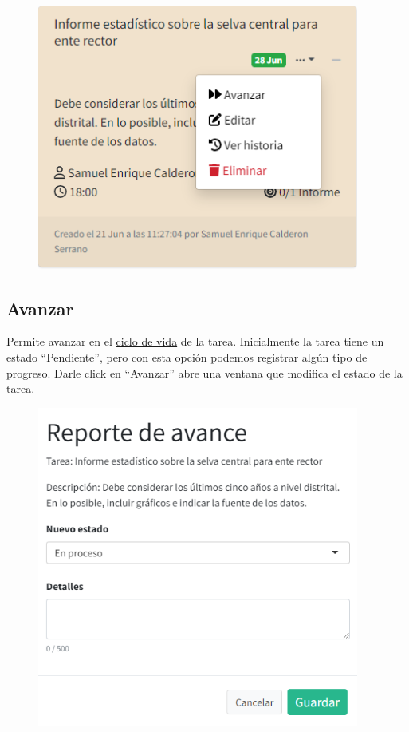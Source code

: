 \documentclass[
  letterpaper,
  DIV=11,
  numbers=noendperiod]{scrreprt}
\begin{document}
\begin{figure}

{\centering \includegraphics[width=4.16667in,height=\textheight]{./img/manual-user/task-menu.png}

}

\end{figure}

\hypertarget{avanzar}{%
\subsection{Avanzar}\label{avanzar}}

Permite avanzar en el \protect\hyperlink{sec-ciclo-de-vida}{ciclo de
vida} de la tarea. Inicialmente la tarea tiene un estado ``Pendiente'',
pero con esta opción podemos registrar algún tipo de progreso. Darle
click en ``Avanzar'' abre una ventana que modifica el estado de la
tarea.

\begin{figure}

{\centering \includegraphics[width=4.16667in,height=\textheight]{./img/manual-user/task-progress.png}

}

\end{figure}
\end{document}
